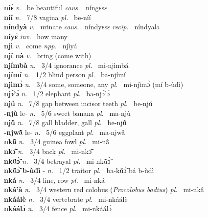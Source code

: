 {\bfseries níɛ̀}  {\itshape v.~} be beautiful   {\itshape caus.~} níngɛsɛ  \\ 
{\bfseries níí}  {\itshape n.~} 7/8 vagina {\itshape pl.~} be-níí    \\ 
{\bfseries níndyà}  {\itshape v.~} urinate   {\itshape caus.~} níndyɛsɛ  {\itshape recip.~} níndyala  \\ 
{\bfseries níyɛ̀}  {\itshape inv.~} how many    \\ 
{\bfseries njì}  {\itshape v.~} come   {\itshape npp.~} njìyá  \\ 
{\bfseries njí nà}  {\itshape v.~} bring (come with)    \\ 
{\bfseries njímbà}  {\itshape n.~} 3/4 ignorance {\itshape pl.~} mi-njìmbá    \\ 
{\bfseries njímí}  {\itshape n.~} 1/2 blind person {\itshape pl.~} ba-njímí    \\ 
{\bfseries njìmɔ̀}  {\itshape n.~} 3/4 some, someone, any {\itshape pl.~} mi-njìmɔ̀ (mí b-ùdì)    \\ 
{\bfseries njɔ́'ɔ̀}  {\itshape n.~} 1/2 elephant {\itshape pl.~} ba-njɔ́'ɔ̀    \\ 
{\bfseries njú}  {\itshape n.~} 7/8 gap between incisor teeth {\itshape pl.~} be-njú    \\ 
{\bfseries -njù} le- {\itshape n.~} 5/6 sweet banana {\itshape pl.~} ma-njù    \\ 
{\bfseries njũ̂}  {\itshape n.~} 7/8 gall bladder, gall {\itshape pl.~} be-njũ̂    \\ 
{\bfseries -njwã̂} le- {\itshape n.~} 5/6 eggplant {\itshape pl.~} ma-njwã̂    \\ 
{\bfseries nkã̂}  {\itshape n.~} 3/4 guinea fowl {\itshape pl.~} mi-nã̂    \\ 
{\bfseries nkɔ̃̂}  {\itshape n.~} 3/4 back {\itshape pl.~} mi-nkɔ̃̂    \\ 
{\bfseries nkṹɔ̃̀}  {\itshape n.~} 3/4 betrayal {\itshape pl.~} mi-nkṹɔ̃̀    \\ 
{\bfseries nkṹɔ̃̀ b-ùdì} - {\itshape n.~} 1/2 traitor {\itshape pl.~} ba-kṹɔ̃̀ bá b-ùdì    \\ 
{\bfseries nká}  {\itshape n.~} 3/4 line, row {\itshape pl.~} mi-nká    \\ 
{\bfseries nká'à}  {\itshape n.~} 3/4 western red colobus ({\itshape Procolobus badius}) {\itshape pl.~} mi-nkâ    \\ 
{\bfseries nkáálè}  {\itshape n.~} 3/4 vertebrate {\itshape pl.~} mi-nkáálè    \\ 
{\bfseries nkáálɔ́}  {\itshape n.~} 3/4 fence {\itshape pl.~} mi-nkáálɔ́    \\ 
